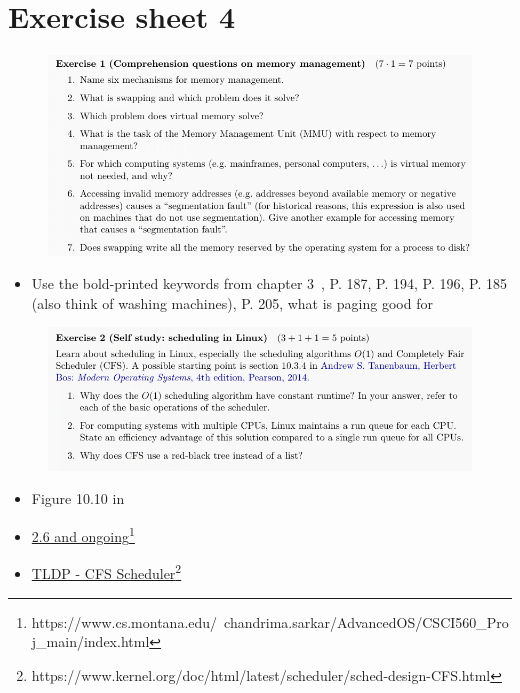 \documentclass[10pt]{beamer}
\begin{document}
\section*{Exercise sheet 4}
\frame{\sectionpage}
\begin{frame}{}
 \begin{figure}
           \includegraphics[keepaspectratio, width=\textwidth, height=\textheight-2\baselineskip-2\baselineskip]{img/100_ex4.png} \\
        \end{figure}
        \begin{itemize}
         \item Use the bold-printed keywords from chapter 3~\autocite{tanenbaum}, P. 187, P. 194, P. 196, P. 185 (also think of washing machines), P. 205,  what is paging good for
        \end{itemize}
        \framebreak
        
  \begin{figure}
          \includegraphics[keepaspectratio, width=\textwidth, height=\textheight-2\baselineskip-2\baselineskip]{img/101_ex4.png} \\
        \end{figure}
        \begin{itemize}
         \item Figure 10.10 in \autocite{tanenbaum}
         \item \href{https://www.cs.montana.edu/~chandrima.sarkar/AdvancedOS/CSCI560\_Proj\_main/index.html}{2.6 and ongoing}\footnote{https://www.cs.montana.edu/~chandrima.sarkar/AdvancedOS/CSCI560\_Proj\_main/index.html}
         \item \href{https://www.kernel.org/doc/html/latest/scheduler/sched-design-CFS.html}{TLDP - CFS Scheduler}\footnote{https://www.kernel.org/doc/html/latest/scheduler/sched-design-CFS.html}
        \end{itemize}
        \framebreak
        

\end{frame}
\end{document}
